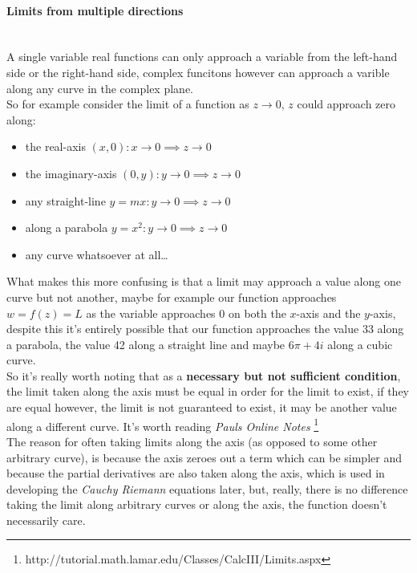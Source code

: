 \documentclass[class=article, crop=false]{standalone}
\begin{document}
\paragraph{Limits from multiple directions}\ \\
A single variable real functions can only approach a variable from the left-hand side or the right-hand side, complex funcitons however can approach a varible along any curve in the complex plane. \\

So for example consider the limit of a function as  $z     \rightarrow 0$, $z$ could approach zero along:

\begin{itemize}
  \item the real-axis $\left( x, 0 \right) : x     \rightarrow 0 \implies z     \rightarrow 0$ 
  \item the imaginary-axis $\left( 0, y \right) : y     \rightarrow 0 \implies z     \rightarrow  0$
  \item any straight-line $y = mx : y     \rightarrow 0 \implies z     \rightarrow 0$
  \item along a parabola $y = x^2 : y     \rightarrow 0 \implies z     \rightarrow 0$
  \item any curve whatsoever at all\dots
\end{itemize}

What makes this more confusing is that a limit may approach a value along one curve but not another, maybe for example our function approaches $w = f \left( z \right) = L$ as the variable approaches 0 on both the  $x$-axis and the $y$-axis, despite this it's entirely possible that our function approaches the value 33 along a parabola, the value 42 along a straight line and maybe $6 \pi +  4i$ along a cubic curve. \\


So it's really worth noting that as a \textbf{necessary but not sufficient condition}, the limit taken along the axis must be equal in order for the limit to exist, if they are equal however, the limit is not guaranteed to exist, it may be another value along a different curve. It's worth reading \textit{Pauls Online Notes} \footnote{http://tutorial.math.lamar.edu/Classes/CalcIII/Limits.aspx}\\

The reason for often taking limits along the axis (as opposed to some other arbitrary curve), is because  the axis zeroes out a term which can be simpler and because the partial derivatives are also taken along the axis, which is used in developing the \textit{Cauchy Riemann} equations later, but, really, there is no difference taking the limit along arbitrary curves or along the axis, the function doesn't necessarily care. \\
\end{document}
